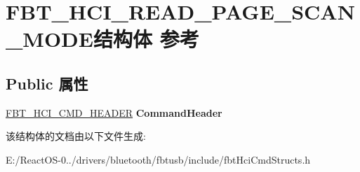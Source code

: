 \hypertarget{struct_f_b_t___h_c_i___r_e_a_d___p_a_g_e___s_c_a_n___m_o_d_e}{}\section{F\+B\+T\+\_\+\+H\+C\+I\+\_\+\+R\+E\+A\+D\+\_\+\+P\+A\+G\+E\+\_\+\+S\+C\+A\+N\+\_\+\+M\+O\+D\+E结构体 参考}
\label{struct_f_b_t___h_c_i___r_e_a_d___p_a_g_e___s_c_a_n___m_o_d_e}
\subsection*{Public 属性}
\begin{DoxyCompactItemize}
\item 
\mbox{\label{struct_f_b_t___h_c_i___r_e_a_d___p_a_g_e___s_c_a_n___m_o_d_e_ae0fbc479eb7418ec53d7dfc7d6293e8f}} 
\hyperlink{struct_f_b_t___h_c_i___c_m_d___h_e_a_d_e_r}{F\+B\+T\+\_\+\+H\+C\+I\+\_\+\+C\+M\+D\+\_\+\+H\+E\+A\+D\+ER} {\bfseries Command\+Header}
\end{DoxyCompactItemize}


该结构体的文档由以下文件生成\+:\begin{DoxyCompactItemize}
\item 
E\+:/\+React\+O\+S-\/0../drivers/bluetooth/fbtusb/include/fbt\+Hci\+Cmd\+Structs.\+h\end{DoxyCompactItemize}
